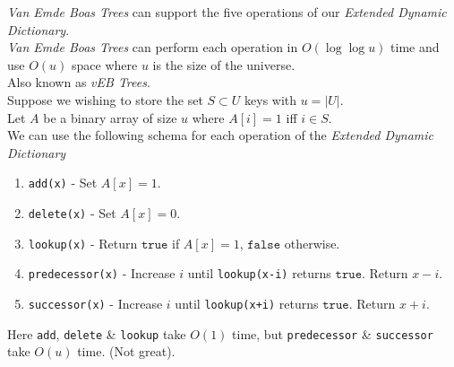 \documentclass[11pt,a4paper]{article}
\begin{document}
\textit{Van Emde Boas Trees} can support the five operations of our \textit{Extended Dynamic Dictionary}.\\
\textit{Van Emde Boas Trees} can perform each operation in $O(\log\log u)$ time and use $O(u)$ space where $u$ is the size of the universe.\\
\nb Also known as \textit{vEB Trees}.\\

Suppose we wishing to store the set $S\subset U$ keys with $u=|U|$.\\
Let $A$ be a binary array of size $u$ where $A[i]=1$ iff $i\in S$.\\
We can use the following schema for each operation of the \textit{Extended Dynamic Dictionary}
\begin{enumerate}
	\item \lstinline!add(x)! - Set $A[x]=1$.
	\item \lstinline!delete(x)! - Set $A[x]=0$.
	\item \lstinline!lookup(x)! - Return $\mathtt{true}$ if  $A[x]=1$, $\mathtt{false}$ otherwise.
	\item \lstinline!predecessor(x)! - Increase $i$ until \lstinline!lookup(x-i)! returns $\mathtt{true}$. Return $x-i$.
	\item \lstinline!successor(x)! - Increase $i$ until \lstinline!lookup(x+i)! returns $\mathtt{true}$. Return $x+i$.
\end{enumerate}
Here \lstinline!add!, \lstinline!delete! \& \lstinline!lookup! take $O(1)$ time, but \lstinline!predecessor! \& \lstinline!successor! take $O(u)$ time. (Not great).\\
\end{document}
